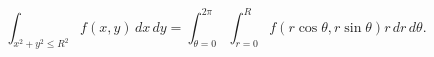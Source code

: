 \[ \int_{x^2 + y^2 \leq R^2} f(x,y)\,dx\,dy
   = \int_{\theta=0}^{2\pi} \int_{r=0}^R
      f(r\cos\theta,r\sin\theta) r\,dr\,d\theta.\]